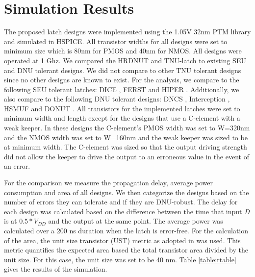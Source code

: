 \section{Simulation Results} \label{sec:res}

The proposed latch designs were implemented using the 1.05V 32nm PTM library \cite{PTM} and simulated in HSPICE. All transistor widths for all designs were set to minimum size which is 80nm for PMOS and 40nm for NMOS. All designs were operated at 1 Ghz. We compared the HRDNUT and TNU-latch to existing SEU and DNU tolerant designs. We did not compare to other TNU tolerant designs since no other designs are known to exist. For the analysis, we compare to the following SEU tolerant latches: DICE \cite{DICE}, FERST \cite{FERST} and HIPER \cite{HIPER}. Additionally, we also compare to the following DNU tolerant designs: DNCS \cite{DNCS}, Interception \cite{Inter}, HSMUF \cite{HSMUF} and DONUT \cite{DONUT}. All transistors for the implemented latches were set to minimum width and length except for the designs that use a C-element with a weak keeper. In these designs the C-element's PMOS width was set to W=320nm and the NMOS width was set to W=160nm and the weak keeper was sized to be at minimum width. The C-element was sized so that the output driving strength did not allow the keeper to drive the output to an erroneous value in the event of an error. 

For the comparison we measure the propagation delay, average power consumption and area of all designs. We then categorize the designs based on the number of errors they can tolerate and if they are DNU-robust. The delay for each design was calculated based on the difference between the time that input \textit{D} is at $0.5*V_{DD}$ and the output at the same point. The average power was calculated over a 200 ns duration when the latch is error-free. For the calculation of the area, the unit size transistor (UST) metric as adopted in \cite{DNCS} was used. This metric quantifies the expected area based the total transistor area divided by the unit size. For this case, the unit size was set to be 40 nm. Table \ref{table:rtable} gives the results of the simulation.

